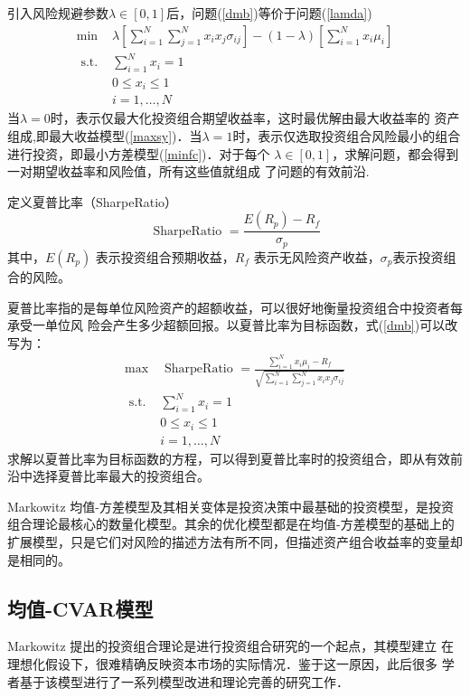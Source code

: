 \documentclass[withoutpreface,bwprint]{cumcmthesis} %
\begin{document}
引入风险规避参数$\lambda \in[0,1]$后，问题(\ref{dmb})等价于问题(\ref{lamda})
\begin{equation}
\begin{array}{ll}
\min & \lambda\left[\sum_{i=1}^{N} \sum_{j=1}^{N} x_{i} x_{j} \sigma_{i j}\right]-(1-\lambda)\left[\sum_{i=1}^{N} x_{i} \mu_{i}\right] \\
\text { s.t. } & \sum_{i=1}^{N} x_{i}=1 \\
& 0 \leq x_{i} \leq 1 \\
& i=1, \ldots, N
\end{array}
\label{lamda}
\end{equation}
当$\lambda =0$时，表示仅最大化投资组合期望收益率，这时最优解由最大收益率的
资产组成,即最大收益模型(\ref{maxsy})．当$\lambda =1$时，表示仅选取投资组合风险最小的组合进行投资，即最小方差模型(\ref{minfc})．对于每个
$\lambda \in[0,1]$，求解问题，都会得到一对期望收益率和风险值，所有这些值就组成
了问题的有效前沿.

定义夏普比率（SharpeRatio）
\begin{equation}
\text { SharpeRatio }=\frac{E\left(R_{p}\right)-R_{f}}{\sigma_{p}}
\end{equation}
其中，$E(R_{p})$ 表示投资组合预期收益，$R_f$
表示无风险资产收益，$\sigma_p$表示投资组合的风险。

夏普比率指的是每单位风险资产的超额收益，可以很好地衡量投资组合中投资者每承受一单位风
险会产生多少超额回报。以夏普比率为目标函数，式(\ref{dmb})可以改写为：
\begin{equation}
\begin{array}{ll}
\max &\text { SharpeRatio }=\frac{\sum_{i=1}^{N} x_{i} \mu_{i} -R_f }{\sqrt{\sum_{i=1}^{N}\sum_{j=1}^{N} x_{i} x_{j} \sigma_{i j}}}  \\
\text { s.t. } & \sum_{i=1}^{N} x_{i}=1 \\
& 0 \leq x_{i} \leq 1 \\
& i=1, \ldots, N
\end{array}
\end{equation}
求解以夏普比率为目标函数的方程，可以得到夏普比率时的投资组合，即从有效前沿中选择夏普比率最大的投资组合。

Markowitz 均值-方差模型及其相关变体是投资决策中最基础的投资模型，是投资组合理论最核心的数量化模型。其余的优化模型都是在均值-方差模型的基础上的扩展模型，只是它们对风险的描述方法有所不同，但描述资产组合收益率的变量却是相同的。
	\subsection{均值-CVAR模型}
	Markowitz 提出的投资组合理论是进行投资组合研究的一个起点，其模型建立
	在理想化假设下，很难精确反映资本市场的实际情况．鉴于这一原因，此后很多
	学者基于该模型进行了一系列模型改进和理论完善的研究工作．
\end{document}

